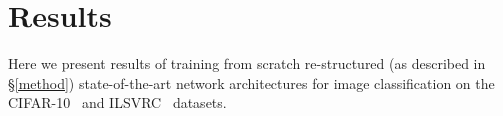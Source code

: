 \documentclass[thesis]{subfiles}
\begin{document}
	
	
	
	
	\section{Results}
	Here we present results of training from scratch re-structured (as described in \S\ref{method}) state-of-the-art network architectures for image classification on the CIFAR-10~\cite{CIFAR10} and ILSVRC~\citep{ILSVRC2015} datasets.
	
\end{document}
